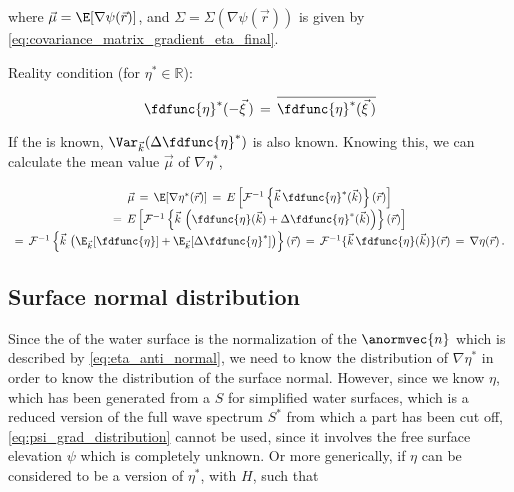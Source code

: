 where $\vec{\mu} = \E[\nabla\psi(\vec{r})]$, and $\Sigma = \Sigma(\nabla\psi(\vec{r}))$ is given by \eqref{eq:covariance_matrix_gradient_eta_final}.

\comment
{
\HRule

Reality condition (for $\eta^*\in\mathbb{R}$):

\begin{equation}
\fdfunc{\eta}^*(-\vec{\xi}\,) \,=\, \overline{\fdfunc{\eta}^*(\vec{\xi}\,)}
\end{equation}

\HRule

If the  is known, $\Var_{\vec{k}}(\Delta\fdfunc{\eta}^*)$ is also known. Knowing this, we can calculate the mean value $\vec{\mu}$ of $\nabla\eta^*$,

\begin{equation}
\renewcommand*{\arraystretch}{1.5}
\begin{array}{c}
\vec{\mu} \,=\, \E[\nabla\eta^*(\vec{r})] \,=\, E\left[\mathcal{F}^{-1}\left\{\vec{k}\,\fdfunc{\eta}^*(\vec{k})\right\}(\vec{r})\right] \\
=\, E\left[\mathcal{F}^{-1}\left\{\vec{k}\,\left(\fdfunc{\eta}(\vec{k})+\Delta\fdfunc{\eta}^*(\vec{k})\right)\right\}(\vec{r})\right] \\
=\, \mathcal{F}^{-1}\left\{\vec{k}\,\left(\E_{\vec{k}}[\fdfunc{\eta}]+\E_{\vec{k}}[\Delta\fdfunc{\eta}^*]\right)\right\}(\vec{r}) \,=\, \mathcal{F}^{-1}\{\vec{k}\,\fdfunc{\eta}(\vec{k})\}(\vec{r}) \,=\, \nabla\eta(\vec{r})\,.
\end{array}
\end{equation}

\HRule
}

\subsection{Surface normal distribution}

Since the  of the water surface is the normalization of the  $\anormvec{n}$ which is described by \eqref{eq:eta_anti_normal}, we need to know the distribution of $\nabla\eta^*$ in order to know the distribution of the surface normal. However, since we know $\eta$, which has been generated from a  $S$ for simplified water surfaces, which is a reduced version of the full wave spectrum $S^*$ from which a part has been cut off, \eqref{eq:psi_grad_distribution} cannot be used, since it involves the free surface elevation $\psi$ which is completely unknown. Or more generically, if $\eta$ can be considered to be a  version of $\eta^*$, with  $H$, such that

